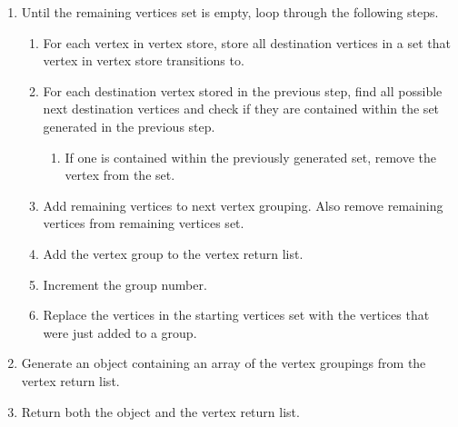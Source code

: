 \begin{enumerate}
   \item Until the remaining vertices set is empty, loop through the following
   steps.
   \begin{enumerate}
     \item For each vertex in vertex store, store all destination vertices in a
     set that vertex in vertex store transitions to.
     \item For each destination vertex stored in the previous step, find all
     possible next destination vertices and check if they are contained within
     the set generated in the previous step.
     \begin{enumerate}
       \item If one is contained within the previously generated set, remove
       the vertex from the set.
     \end{enumerate}
     \item Add remaining vertices to next vertex grouping.  Also remove remaining
     vertices from remaining vertices set.
     \item Add the vertex group to the vertex return list.
     \item Increment the group number.
     \item Replace the vertices in the starting vertices set with the vertices
     that were just added to a group.
   \end{enumerate} 
   \item Generate an object containing an array of the vertex groupings from
   the vertex return list.
   \item Return both the object and the vertex return list.
 \end{enumerate}



